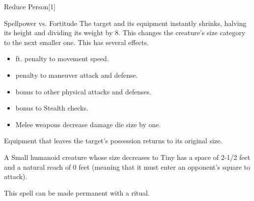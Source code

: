 \begin{spellsection}{Reduce Person}[1]
    \begin{spellheader}
    \end{spellheader}
    \begin{spellcontent}
        \begin{spelltargetinginfo}
        \end{spelltargetinginfo}
        \begin{spelleffects}
            \begin{spellattack}{Spellpower vs. Fortitude}
                \spellsuccess The target and its equipment instantly shrinks, halving its height and dividing its weight by 8. This changes the creature's size category to the next smaller one. This has several effects.
                \begin{itemize} 
                    \item {} ft. penalty to movement speed.
                    \item {} penalty to maneuver attack and defense.
                    \item {} bonus to other physical attacks and defenses.
                    \item {} bonus to Stealth checks.
                    \item Melee weapons decrease damage die size by one.
                \end{itemize}
                \par Equipment that leaves the target's possession returns to its original size.
            \end{spellattack}
            \spelldur \durshort \dismissable
        \end{spelleffects}
    \end{spellcontent}
    \begin{spellfooter}
        \spellnotes A Small humanoid creature whose size decreases to Tiny has a space of 2-1/2 feet and a natural reach of 0 feet (meaning that it must enter an opponent's square to attack).

        \sizingspellnotes This spell can be made permanent with a  ritual.
        \miscastrandom
    \end{spellfooter}
\end{spellsection}

